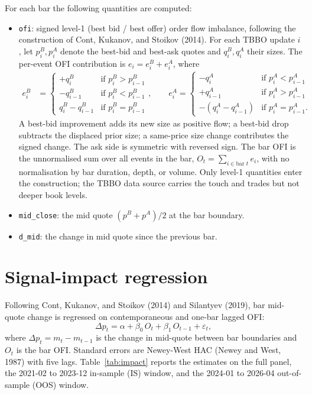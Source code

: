 ﻿\documentclass[11pt,a4paper]{article}
\begin{document}
For each bar the following quantities are computed:
\begin{itemize}
    \item \texttt{ofi}: signed level-1 (best bid / best offer) order flow imbalance, following the construction of Cont, Kukanov, and Stoikov (2014). For each TBBO update $i$, let $p^B_i, p^A_i$ denote the best-bid and best-ask quotes and $q^B_i, q^A_i$ their sizes. The per-event OFI contribution is $e_i = e^B_i + e^A_i$, where
    \begin{align*}
    e^B_i &=
    \begin{cases}
        +q^B_i              & \text{if } p^B_i > p^B_{i-1}  \\
        -q^B_{i-1}          & \text{if } p^B_i < p^B_{i-1}  \\
        q^B_i - q^B_{i-1}   & \text{if } p^B_i = p^B_{i-1}
    \end{cases},
    \qquad
    e^A_i =
    \begin{cases}
        -q^A_i              & \text{if } p^A_i < p^A_{i-1}  \\
        +q^A_{i-1}          & \text{if } p^A_i > p^A_{i-1}  \\
        -(q^A_i - q^A_{i-1})& \text{if } p^A_i = p^A_{i-1}.
    \end{cases}
    \end{align*}
    A best-bid improvement adds its new size as positive flow; a best-bid drop subtracts the displaced prior size; a same-price size change contributes the signed change. The ask side is symmetric with reversed sign. The bar OFI is the unnormalised sum over all events in the bar, $O_t = \sum_{i \in \text{bar } t} e_i$, with no normalisation by bar duration, depth, or volume. Only level-1 quantities enter the construction; the TBBO data source carries the touch and trades but not deeper book levels.
    \item \texttt{mid\_close}: the mid quote $(p^B + p^A)/2$ at the bar boundary.
    \item \texttt{d\_mid}: the change in mid quote since the previous bar.
\end{itemize}

\section{Signal-impact regression}
\label{sec:impact}

Following Cont, Kukanov, and Stoikov (2014) and Silantyev (2019), bar mid-quote change is regressed on contemporaneous and one-bar lagged OFI:
\begin{equation}
\Delta p_t = \alpha + \beta_0 \, O_t + \beta_1 \, O_{t-1} + \varepsilon_t,
\end{equation}
where $\Delta p_t = m_t - m_{t-1}$ is the change in mid-quote between bar boundaries and $O_t$ is the bar OFI. Standard errors are Newey-West HAC (Newey and West, 1987) with five lags. Table~\ref{tab:impact} reports the estimates on the full panel, the 2021-02 to 2023-12 in-sample (IS) window, and the 2024-01 to 2026-04 out-of-sample (OOS) window.
\end{document}
